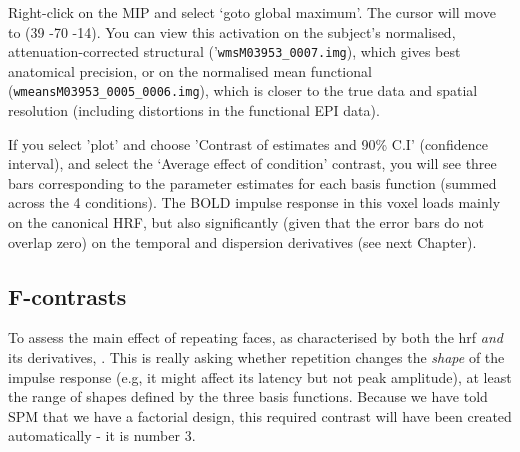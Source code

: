 Right-click on the MIP and select `goto global maximum'. The cursor will move to (39 -70 -14). You can view this activation on the subject's normalised, attenuation-corrected structural ('\verb!wmsM03953_0007.img!), which gives best anatomical precision, or on the normalised mean functional (\verb!wmeansM03953_0005_0006.img!), which is closer to the true data and spatial resolution (including distortions in the functional EPI data). 

If you select 'plot' and choose 'Contrast of estimates and 90\% C.I' (confidence interval), and select the `Average effect of condition' contrast, you will see three bars corresponding to the parameter estimates for each basis function (summed across the 4 conditions). The BOLD impulse response in this voxel loads mainly on the canonical HRF, but also significantly (given that the error bars do not overlap zero) on the temporal and dispersion derivatives (see next Chapter).

\subsection{F-contrasts}

To assess the main effect of repeating faces, as characterised by both the hrf {\em and} its derivatives,    . This is really asking whether repetition changes the {\em shape} of the impulse response (e.g, it might affect its latency but not peak amplitude), at least the range of shapes defined by the three basis functions. Because we have told SPM that we have a factorial design, this required contrast will have been created automatically - it is number 3. 

